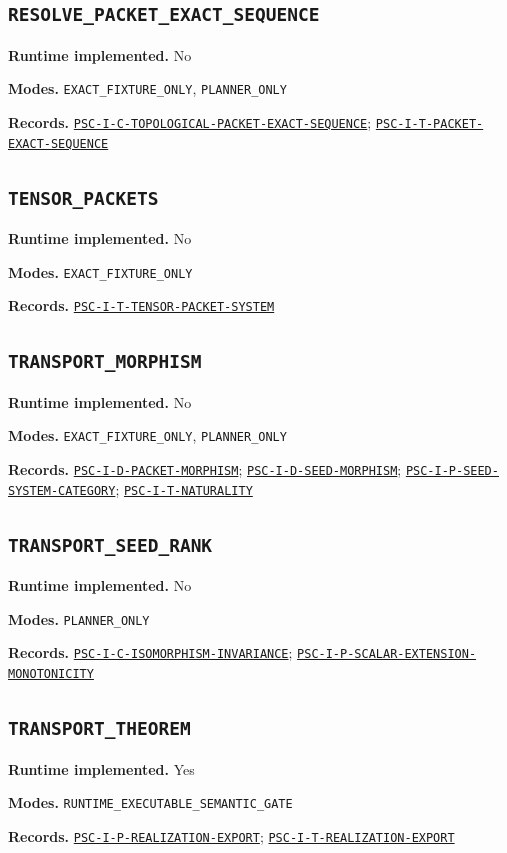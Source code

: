 \documentclass[a4paper,11pt]{article}
\newcommand{\field}[2]{\noindent\textbf{#1.} #2\par}
\begin{document}
\subsection*{\nolinkurl{RESOLVE_PACKET_EXACT_SEQUENCE}}
\field{Runtime implemented}{No}
\field{Modes}{\nolinkurl{EXACT_FIXTURE_ONLY}, \nolinkurl{PLANNER_ONLY}}
\field{Records}{\hyperref[rec:PSC-I-C-TOPOLOGICAL-PACKET-EXACT-SEQUENCE]{\nolinkurl{PSC-I-C-TOPOLOGICAL-PACKET-EXACT-SEQUENCE}}; \hyperref[rec:PSC-I-T-PACKET-EXACT-SEQUENCE]{\nolinkurl{PSC-I-T-PACKET-EXACT-SEQUENCE}}}
\subsection*{\nolinkurl{TENSOR_PACKETS}}
\field{Runtime implemented}{No}
\field{Modes}{\nolinkurl{EXACT_FIXTURE_ONLY}}
\field{Records}{\hyperref[rec:PSC-I-T-TENSOR-PACKET-SYSTEM]{\nolinkurl{PSC-I-T-TENSOR-PACKET-SYSTEM}}}
\subsection*{\nolinkurl{TRANSPORT_MORPHISM}}
\field{Runtime implemented}{No}
\field{Modes}{\nolinkurl{EXACT_FIXTURE_ONLY}, \nolinkurl{PLANNER_ONLY}}
\field{Records}{\hyperref[rec:PSC-I-D-PACKET-MORPHISM]{\nolinkurl{PSC-I-D-PACKET-MORPHISM}}; \hyperref[rec:PSC-I-D-SEED-MORPHISM]{\nolinkurl{PSC-I-D-SEED-MORPHISM}}; \hyperref[rec:PSC-I-P-SEED-SYSTEM-CATEGORY]{\nolinkurl{PSC-I-P-SEED-SYSTEM-CATEGORY}}; \hyperref[rec:PSC-I-T-NATURALITY]{\nolinkurl{PSC-I-T-NATURALITY}}}
\subsection*{\nolinkurl{TRANSPORT_SEED_RANK}}
\field{Runtime implemented}{No}
\field{Modes}{\nolinkurl{PLANNER_ONLY}}
\field{Records}{\hyperref[rec:PSC-I-C-ISOMORPHISM-INVARIANCE]{\nolinkurl{PSC-I-C-ISOMORPHISM-INVARIANCE}}; \hyperref[rec:PSC-I-P-SCALAR-EXTENSION-MONOTONICITY]{\nolinkurl{PSC-I-P-SCALAR-EXTENSION-MONOTONICITY}}}
\subsection*{\nolinkurl{TRANSPORT_THEOREM}}
\field{Runtime implemented}{Yes}
\field{Modes}{\nolinkurl{RUNTIME_EXECUTABLE_SEMANTIC_GATE}}
\field{Records}{\hyperref[rec:PSC-I-P-REALIZATION-EXPORT]{\nolinkurl{PSC-I-P-REALIZATION-EXPORT}}; \hyperref[rec:PSC-I-T-REALIZATION-EXPORT]{\nolinkurl{PSC-I-T-REALIZATION-EXPORT}}}
\end{document}
